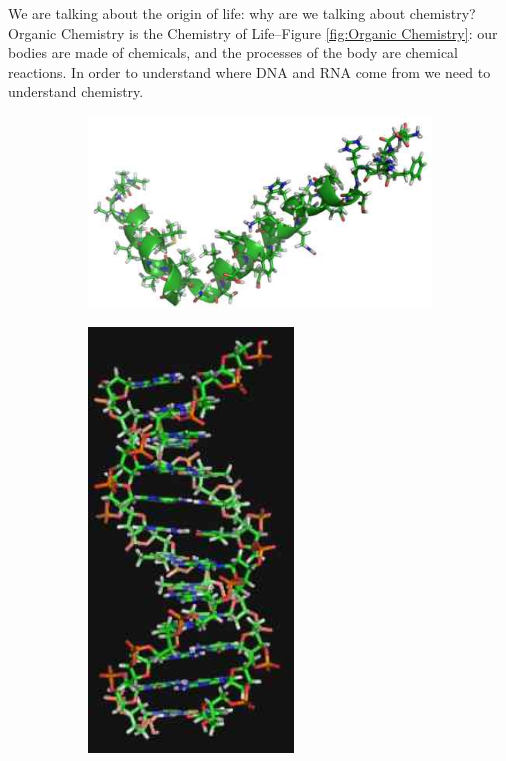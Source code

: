 \documentclass[]{article}
\begin{document}
We are talking about the origin of life: why are we talking about chemistry? Organic Chemistry is the Chemistry of Life--Figure \ref{fig:Organic Chemistry}: our bodies are made of chemicals, and the processes of the body are chemical reactions. In order to understand where DNA and RNA come from we need to understand chemistry.


\begin{figure}[H]
	\caption {Organic Chemistry is the Chemistry of Life}\label{fig:Organic Chemistry}
	\begin{subfigure}[b]{0.55\textwidth}
		\includegraphics[width=\textwidth]{OrgChem1}
	\end{subfigure}
	\;
	\begin{subfigure}[b]{0.35\textwidth}
		\includegraphics[width=0.6\textwidth]{OrgChem2}
	\end{subfigure}
\end{figure}
\end{document}
